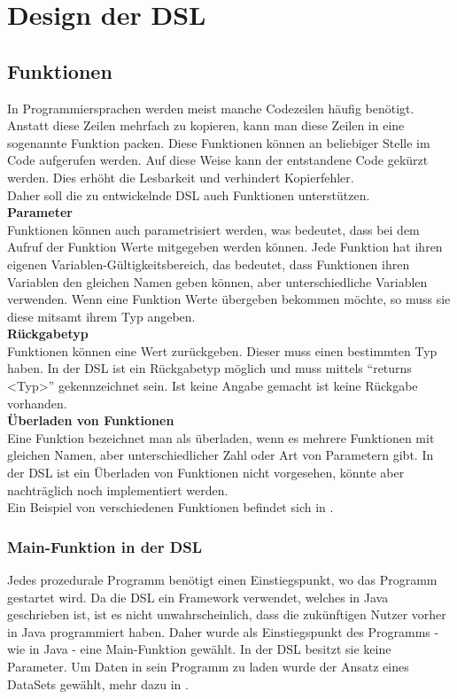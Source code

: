 
\chapter{Design der DSL}

\section{Funktionen}
In Programmiersprachen werden meist manche Codezeilen häufig benötigt.
Anstatt diese Zeilen mehrfach zu kopieren, kann man diese Zeilen in eine sogenannte Funktion packen.
Diese Funktionen können an beliebiger Stelle im Code aufgerufen werden.
Auf diese Weise kann der entstandene Code gekürzt werden.
Dies erhöht die Lesbarkeit und verhindert Kopierfehler.\\
Daher soll die zu entwickelnde \ac{DSL} auch Funktionen unterstützen.\\
\textbf{Parameter}\\
Funktionen können auch parametrisiert werden, was bedeutet, dass bei dem Aufruf der Funktion Werte mitgegeben werden können.
Jede Funktion hat ihren eigenen Variablen-Gültigkeitsbereich, das bedeutet, dass Funktionen ihren Variablen den gleichen Namen geben können, aber unterschiedliche Variablen verwenden.
Wenn eine Funktion Werte übergeben bekommen möchte, so muss sie diese mitsamt ihrem Typ angeben.\\
\textbf{Rückgabetyp}\\
Funktionen können eine Wert zurückgeben.
Dieser muss einen bestimmten Typ haben.
In der DSL ist ein Rückgabetyp möglich und muss mittels ``returns <Typ>'' gekennzeichnet sein.
Ist keine Angabe gemacht ist keine Rückgabe vorhanden.\\
\textbf{Überladen von Funktionen}\\
Eine Funktion bezeichnet man als überladen, wenn es mehrere Funktionen mit gleichen Namen, aber unterschiedlicher Zahl oder Art von Parametern gibt.
In der DSL ist ein Überladen von Funktionen nicht vorgesehen, könnte aber nachträglich noch implementiert werden.\\
Ein Beispiel von verschiedenen Funktionen befindet sich in .\\

\subsection{Main-Funktion in der \acs{DSL}}
Jedes prozedurale Programm benötigt einen Einstiegspunkt, wo das Programm gestartet wird.
Da die DSL ein Framework verwendet, welches in Java geschrieben ist, ist es nicht unwahrscheinlich, dass die zukünftigen Nutzer vorher in Java programmiert haben.
Daher wurde als Einstiegspunkt des Programms - wie in Java - eine Main-Funktion gewählt.
In der DSL besitzt sie keine Parameter.
Um Daten in sein Programm zu laden wurde der Ansatz eines DataSets gewählt, mehr dazu in .

